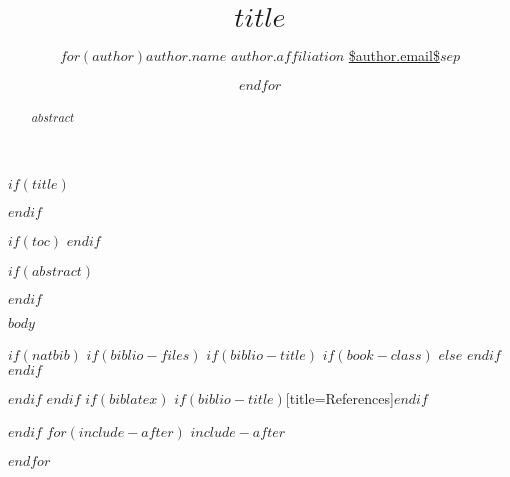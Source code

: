 \documentclass[unnumbered,letter,11pt,article,oneside]{memoir}
\title{\bigskip \bigskip $title$}
\author{$for(author)$\Large $author.name$\vspace{0.05in} \newline\normalsize\emph{$author.affiliation$} \newline\footnotesize \url{$author.email$}\vspace*{0.2in}\newline $sep$ \and $endfor$}
\date{}
\begin{document}
  



$if(title)$
\maketitle
$endif$

$if(toc)$
{
\hypersetup{linkcolor=black}
\setcounter{tocdepth}{$toc-depth$}
\tableofcontents
}
$endif$

$if(abstract)$

\begin{abstract}

\noindent $abstract$

\end{abstract}

$endif$

$body$


$if(natbib)$
$if(biblio-files)$
$if(biblio-title)$
$if(book-class)$
\renewcommand\bibname{Bibliography}
$else$
\renewcommand\refname{References}
$endif$
$endif$


$endif$
$endif$
$if(biblatex)$
\printbibliography$if(biblio-title)$[title=References]$endif$

$endif$
$for(include-after)$
$include-after$

$endfor$
\end{document}
